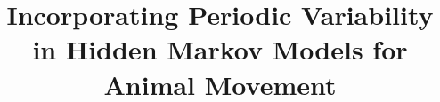 \documentclass{bmcart}
\begin{document}
\titlepage
\

\begin{frontmatter}

\begin{fmbox}


\title{Incorporating Periodic Variability in Hidden Markov Models for Animal Movement}


\author[
   addressref={aff1},                   %
   email={lim88@mcmaster.ca}   %
]
{ }
\author[
   addressref={aff1,aff2},
   email={bolker@mcmaster.ca}
]{ }


\address[id=aff1]{                            %
  , %
  ,                     %
  ,                                %
  ,                              %
}
\address[id=aff2]{
  ,
  ,
  ,
  ,
}


\end{fmbox}
\end{frontmatter}
\end{document}
